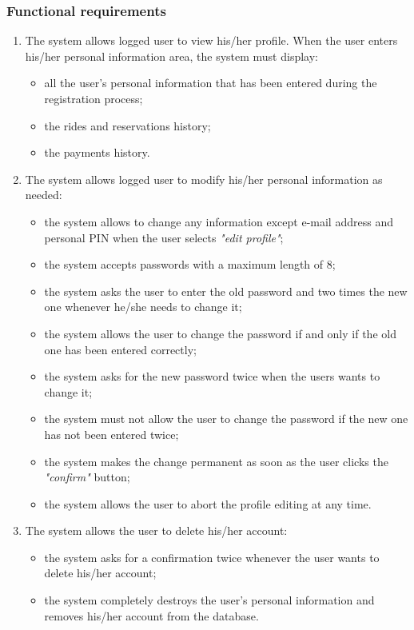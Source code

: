 \subsubsection{Functional requirements}
\begin{enumerate}
\item The system allows logged user to view his/her profile. When the user enters his/her personal information area, the system must display:
	\begin{itemize}
	\item all the user's personal information that has been entered during the registration process;
	\item the rides and reservations history;
	\item the payments history.
	\end{itemize}
\item The system allows logged user to modify his/her personal information as needed:
	\begin{itemize}
	\item the system allows to change any information except e-mail address and personal PIN when the user selects \emph{"edit profile"};
	\item the system accepts passwords with a maximum length of 8;
	\item the system asks the user to enter the old password and two times the new one whenever he/she needs to change it;
	\item the system allows the user to change the password if and only if the old one has been entered correctly;
	\item the system asks for the new password twice when the users wants to change it;
	\item the system must not allow the user to change the password if the new one has not been entered twice;
	\item the system makes the change permanent as soon as the user clicks the \emph{"confirm"} button;
	\item the system allows the user to abort the profile editing at any time.
	\end{itemize}
\item The system allows the user to delete his/her account:
	\begin{itemize}
	\item the system asks for a confirmation twice whenever the user wants to delete his/her account;
	\item the system completely destroys the user's personal information and removes his/her account from the database.
	\end{itemize}
\end{enumerate}

